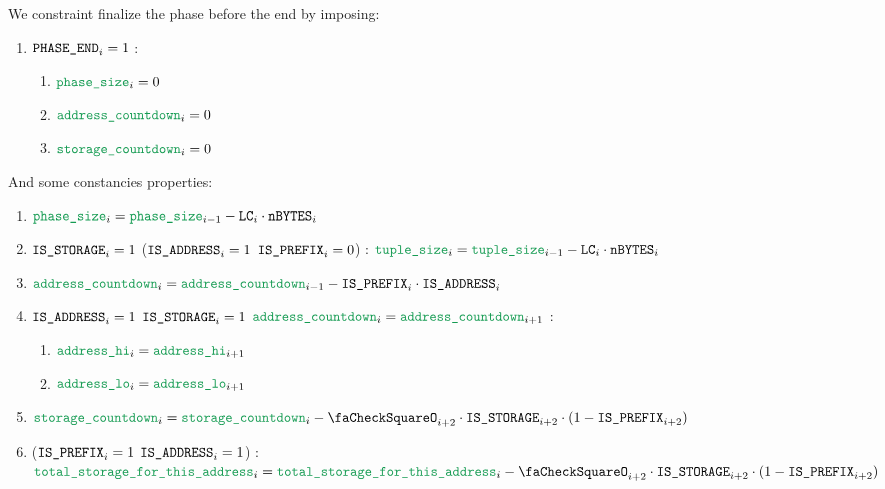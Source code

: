 \begin{enumerate}[resume]
		We constraint finalize the phase before the end by imposing:
		\begin{enumerate}
			\item \If $\texttt{PHASE\_END} _{i} =1$ \Then:
				\begin{enumerate}
					\item $\locPhaseSize _{i} =0$
					\item $\locAddressPrewarmingCountdown _{i} =0$
					\item $\locStoragePrewarmingCountdown _{i} =0$
				\end{enumerate}
		\end{enumerate}

		And some constancies properties:
		\begin{enumerate}
			\item $\locPhaseSize _{i} = \locPhaseSize _{i - 1} - \lc _{i} \cdot \limbsize _{i}$
			\item \If $\texttt{IS\_STORAGE} _{i} =1$ \Or ($\texttt{IS\_ADDRESS} _{i} =1$ \et $\texttt{IS\_PREFIX} _{i} =0$) \Then: $\locAccessListTupleSize _{i} = \locAccessListTupleSize _{i - 1} - \lc _{i} \cdot \limbsize _{i}$
			\item $\locAddressPrewarmingCountdown _{i} = \locAddressPrewarmingCountdown _{i - 1} - \isPrefix _{i} \cdot \isAddr _{i}$
			\item \If $\texttt{IS\_ADDRESS} _{i} =1$ \et $\texttt{IS\_STORAGE} _{i}=1$ \et $\locAddressPrewarmingCountdown _{i} = \locAddressPrewarmingCountdown _{i + 1}$ \Then:
				\begin{enumerate}
					\item $\locAddressHi _{i} = \locAddressHi _{i + 1}$
					\item $\locAddressLo _{i} = \locAddressLo _{i + 1}$
				\end{enumerate}
			\item $\locStoragePrewarmingCountdown _{i} = \locStoragePrewarmingCountdown _{i} - \done _{i + 2} \cdot \isSto _{i + 2} \cdot (1 - \isPrefix _{i + 2})$
			\item \If ($\texttt{IS\_PREFIX} _{i} =1$ \et $\texttt{IS\_ADDRESS} _{i} =1$) \Then: $\locTotStorageForThisAddress _{i} = \locTotStorageForThisAddress _{i} - \done _{i + 2} \cdot \isSto _{i + 2} \cdot (1 - \isPrefix _{i + 2})$
		\end{enumerate}
	\end{enumerate}
